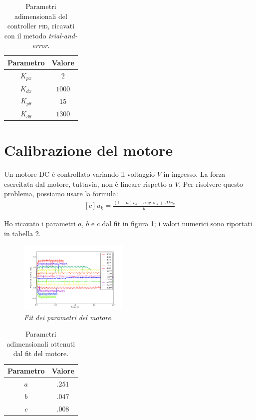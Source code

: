 \begin{table}[H]
  \centering
  \begin{tabular}[t]{cc}
    \toprule
    Parametro &Valore\\
    \midrule
    $K_{px}$ & $2$ \\
    $K_{dx}$ & $1000$ \\
    $K_{p\theta} $ & $15$   \\
    $K_{d\theta}$ & $1300$ \\
    \bottomrule
  \end{tabular}
  \caption{
    Parametri adimensionali del controller \textsc{pid}, ricavati con il metodo \emph{trial-and-error}.
  }
  \label{tab:coefficienti-pid}
\end{table}

\section{Calibrazione del motore}\label{sec:calibrazione-motore}
Un motore DC è controllato variando il voltaggio $V$ in ingresso. La forza esercitata dal motore, tuttavia, non è
lineare rispetto a $V$. Per risolvere questo problema, possiamo usare la formula\cite{dcControl}:
  \begin{equation}
    \begin{aligned}[c]
      u_k = \frac {(1-a)v_k -c \text{sign} v_k + \Delta t \dot v_k} {b}
    \end{aligned}
    \label{eq:motore}
  \end{equation}

Ho ricavato i parametri $a$, $b$ e $c$ dal fit in figura \ref{fig:fit}; i valori numerici sono riportati in tabella \ref{tab:fit}.

\begin{figure}[H]
  \includegraphics[width=0.47\textwidth]{../assets/fit.png}
  \caption{\emph{Fit dei parametri del motore.}}
  \label{fig:fit}
\end{figure}

\begin{table}[H]
  \centering
  \begin{tabular}[t]{cc}
    \toprule
    Parametro &Valore\\
    \midrule
    $a$ & $.251$ \\
    $b$ & $.047$ \\
    $c$ & $.008$ \\
    \bottomrule
  \end{tabular}
  \caption{
    Parametri adimensionali ottenuti dal fit del motore.
  }
  \label{tab:fit}
\end{table}

